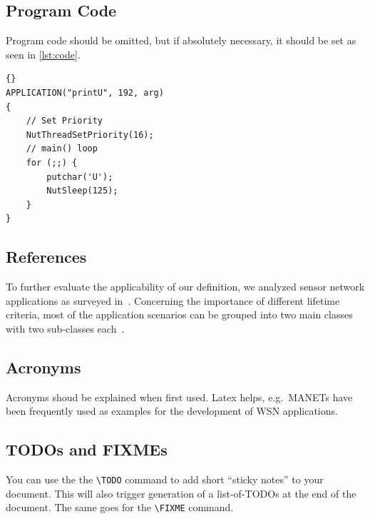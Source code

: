 \subsection{Program Code}

Program code should be omitted, but if absolutely necessary, it should be set as seen in \cref{lst:code}.

\begin{lstlisting}[style=txt,caption=Sample application,label=lst:code]{}
APPLICATION("printU", 192, arg)
{
    // Set Priority
    NutThreadSetPriority(16);
    // main() loop
    for (;;) {
        putchar('U');
        NutSleep(125);
    }
}
\end{lstlisting}


\subsection{References}

To further evaluate the applicability of our definition, we analyzed sensor network applications as surveyed in~\cite{akyildiz2002survey,arampatzis2005survey,khemapach2005survey}. Concerning the importance of different lifetime criteria, most of the application scenarios can be grouped into two main classes with two sub-classes each~\cite{dietrich2009lifetime}.


\subsection{Acronyms}

Acronyms shoud be explained when first used. Latex helps, e.g.\ \acp{MANET} have been frequently used as examples for the development of \ac{WSN} applications.


\subsection{TODOs and FIXMEs}

You can use the the \verb|\TODO| command to add short ``sticky notes'' to your document. 
This will also trigger generation of a list-of-TODOs at the end of the document. 
The same goes for the \verb|\FIXME| command.



